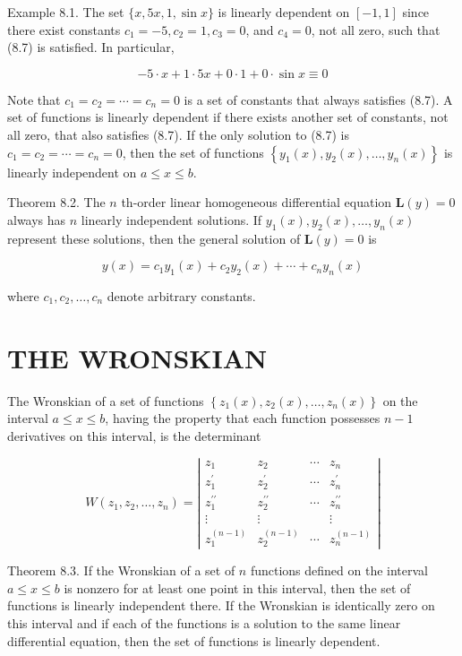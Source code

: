 \documentclass[10pt]{article}
\begin{document}
Example 8.1. The set $\{x, 5 x, 1, \sin x\}$ is linearly dependent on $[-1,1]$ since there exist constants $c_{1}=-5, c_{2}=1, c_{3}=0$, and $c_{4}=0$, not all zero, such that (8.7) is satisfied. In particular,

$$
-5 \cdot x+1 \cdot 5 x+0 \cdot 1+0 \cdot \sin x \equiv 0
$$

Note that $c_{1}=c_{2}=\cdots=c_{n}=0$ is a set of constants that always satisfies (8.7). A set of functions is linearly dependent if there exists another set of constants, not all zero, that also satisfies (8.7). If the only solution to (8.7) is $c_{1}=c_{2}=\cdots=c_{n}=0$, then the set of functions $\left\{y_{1}(x), y_{2}(x), \ldots, y_{n}(x)\right\}$ is linearly independent on $a \leq x \leq b$.

Theorem 8.2. The $n$ th-order linear homogeneous differential equation $\mathbf{L}(y)=0$ always has $n$ linearly independent solutions. If $y_{1}(x), y_{2}(x), \ldots, y_{n}(x)$ represent these solutions, then the general solution of $\mathbf{L}(y)=0$ is


\begin{equation*}
y(x)=c_{1} y_{1}(x)+c_{2} y_{2}(x)+\cdots+c_{n} y_{n}(x) \tag{8.8}
\end{equation*}


where $c_{1}, c_{2}, \ldots, c_{n}$ denote arbitrary constants.

\section*{THE WRONSKIAN}
The Wronskian of a set of functions $\left\{z_{1}(x), z_{2}(x), \ldots, z_{n}(x)\right\}$ on the interval $a \leq x \leq b$, having the property that each function possesses $n-1$ derivatives on this interval, is the determinant

$$
W\left(z_{1}, z_{2}, \ldots, z_{n}\right)=\left|\begin{array}{cccc}
z_{1} & z_{2} & \cdots & z_{n} \\
z_{1}^{\prime} & z_{2}^{\prime} & \cdots & z_{n}^{\prime} \\
z_{1}^{\prime \prime} & z_{2}^{\prime \prime} & \cdots & z_{n}^{\prime \prime} \\
\vdots & \vdots & & \vdots \\
z_{1}^{(n-1)} & z_{2}^{(n-1)} & \cdots & z_{n}^{(n-1)}
\end{array}\right|
$$

Theorem 8.3. If the Wronskian of a set of $n$ functions defined on the interval $a \leq x \leq b$ is nonzero for at least one point in this interval, then the set of functions is linearly independent there. If the Wronskian is identically zero on this interval and if each of the functions is a solution to the same linear differential equation, then the set of functions is linearly dependent.
\end{document}
